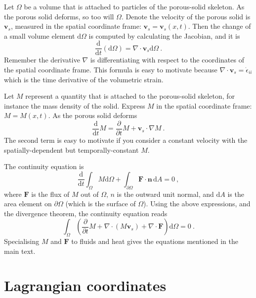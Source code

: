 \documentclass[12pt]{report}
\def\d{\mathrm{d}}
\begin{document}
Let $\Omega$ be a volume that is attached to particles of the
porous-solid skeleton.  As the porous solid deforms, so too will
$\Omega$.  Denote the velocity of the porous solid is ${\mathbf
  v}_{s}$, measured in the spatial coordinate frame: ${\mathbf v}_{s}
= {\mathbf v}_{s}(x, t)$.  Then the change of a small volume element
$\d\Omega$ is computed by calculating the Jacobian, and it is
\begin{equation}
\frac{\d}{\d t} (\d\Omega) = \nabla\cdot{\mathbf v}_{s} \d\Omega \ .
\end{equation}
Remember the derivative $\nabla$ is differentiating with respect to
the coordinates of the spatial coordinate frame.  This formula is easy
to motivate because $\nabla\cdot{\mathbf v}_{s} = \dot{\epsilon}_{ii}$
which is the time derivative of the volumetric strain.

Let $M$ represent a quantity that is attached to the porous-solid
skeleton, for instance the mass density of the solid.  Express $M$ in
the spatial coordinate frame: $M=M(x, t)$.  As the porous
solid deforms
\begin{equation}
\frac{\d}{\d t}M = \frac{\partial}{\partial t}M + {\mathbf v}_{s}\cdot
\nabla M \ .
\end{equation}
The second term is easy to motivate if you consider a constant
velocity with the spatially-dependent but temporally-constant $M$.

The continuity equation is
\begin{equation}
\frac{\d}{\d t}\int_{\Omega}M \d\Omega + \int_{\partial
  \Omega}{\mathbf F}\cdot{\mathbf n}\,\d A = 0 \ ,
\end{equation}
where ${\mathbf F}$ is the flux of $M$ out of $\Omega$, $n$ is the
outward unit normal, and $\d A$ is the area element on
$\partial\Omega$ (which is the surface of $\Omega$).  Using the above
expressions, and the divergence theorem, the continuity equation reads
\begin{equation}
\int_{\Omega} \left( \frac{\partial}{\partial t}M + \nabla\cdot(M{\mathbf
  v}_{s}) + \nabla\cdot{\mathbf F}  \right)\d\Omega = 0 \ .
\label{equation.continuity.eul}
\end{equation}
Specialising $M$ and ${\mathbf F}$ to fluids and heat gives the
equations mentioned in the main text.


\section{Lagrangian coordinates}
\end{document}
